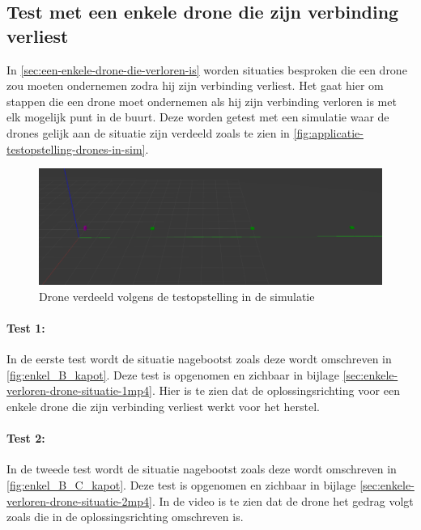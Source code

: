 \documentclass[a4paper, 11pt, oneside]{report}
\begin{document}
\subsection{Test met een enkele drone die zijn verbinding verliest}

In \autoref{sec:een-enkele-drone-die-verloren-is} worden situaties besproken die een drone zou moeten ondernemen zodra hij zijn verbinding verliest. Het gaat hier om stappen die een drone moet ondernemen als hij zijn verbinding verloren is met elk mogelijk punt in de buurt.
Deze worden getest met een simulatie waar de drones gelijk aan de situatie zijn verdeeld zoals te zien in 	\autoref{fig:applicatie-testopstelling-drones-in-sim}.

\begin{figure}[H]
	\begin{center}\includegraphics[width=\linewidth]{Afbeeldingen/droneopstelling_in_sim.png}\end{center}
	\caption{Drone verdeeld volgens de testopstelling in de simulatie}
	\label{fig:applicatie-testopstelling-drones-in-sim}
\end{figure}
\paragraph{Test 1:} In de eerste test wordt de situatie nagebootst zoals deze wordt omschreven in \autoref{fig:enkel_B_kapot}.
Deze test is opgenomen en zichbaar in bijlage \ref{sec:enkele-verloren-drone-situatie-1mp4}. 
Hier is te zien dat de oplossingsrichting voor een enkele drone die zijn verbinding verliest werkt voor het herstel.

\paragraph{Test 2:} In de tweede test wordt de situatie nagebootst zoals deze wordt omschreven in \autoref{fig:enkel_B_C_kapot}.
Deze test is opgenomen en zichbaar in bijlage \ref{sec:enkele-verloren-drone-situatie-2mp4}.
In de video is te zien dat de drone het gedrag volgt zoals die in de oplossingsrichting omschreven is. 
\end{document}
